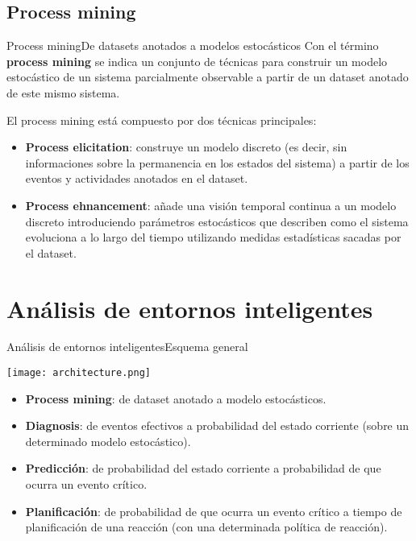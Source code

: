 \documentclass[9pt, handout]{beamer}
\begin{document}
    \subsection{Process mining}
      \begin{frame}{Process mining}{De datasets anotados a modelos estocásticos}
        \pause
        Con el término \textbf{process mining} se indica un conjunto de técnicas para construir un modelo estocástico de un sistema parcialmente observable a partir de un dataset anotado de este mismo sistema.
        
        \pause
        \vspace{1em}
        El process mining está compuesto por dos técnicas principales:
        \pause
        \begin{itemize}
          \item \textbf{Process elicitation}: construye un modelo discreto (es decir, sin informaciones sobre la permanencia en los estados del sistema) a partir de los eventos y actividades anotados en el dataset.
          \pause
          \item \textbf{Process ehnancement}: añade una visión temporal continua a un modelo discreto introduciendo parámetros estocásticos que describen como el sistema evoluciona a lo largo del tiempo utilizando medidas estadísticas sacadas por el dataset.
        \end{itemize}
      \end{frame}
    
  \section{Análisis de entornos inteligentes}
  
    \begin{frame}{Análisis de entornos inteligentes}{Esquema general}
      \vspace{-1em}
      \begin{center}
        \texttt{[image: architecture.png]}
      \end{center}
      
      \pause
      \begin{itemize}
        \item \textbf{Process mining}: de dataset anotado a modelo estocásticos.
        \pause
        \item \textbf{Diagnosis}: de eventos efectivos a probabilidad del estado corriente (sobre un determinado modelo estocástico).
        \pause
        \item \textbf{Predicción}: de probabilidad del estado corriente a probabilidad de que ocurra un evento crítico.
        \pause
        \item \textbf{Planificación}: de probabilidad de que ocurra un evento crítico a tiempo de planificación de una reacción (con una determinada política de reacción).
      \end{itemize}
    \end{frame}
  
\end{document}
